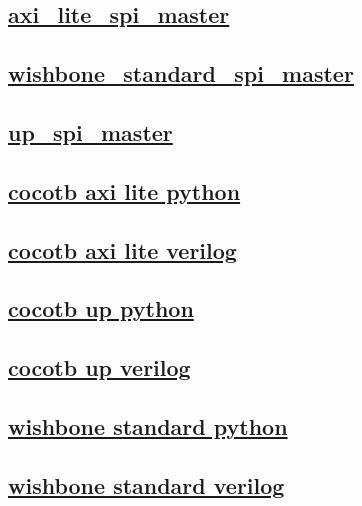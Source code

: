 \documentclass{article}
\begin{document}
  


  \subsection{\href{../files/axi_lite_spi_master-v.html}{axi\_lite\_spi\_master}}

  \subsection{\href{../files/wishbone_standard_spi_master-v.html}{wishbone\_standard\_spi\_master}}

  \subsection{\href{../files/up_spi_master-v.html}{up\_spi\_master}}

  \subsection{\href{../files2/tb_cocotb_axi_lite-py.html}{cocotb axi lite python}}
  \subsection{\href{../files2/tb_cocotb_axi_lite-v.html}{cocotb axi lite verilog}}
  \subsection{\href{../files2/tb_cocotb_up-py.html}{cocotb up python}}
  \subsection{\href{../files2/tb_cocotb_up-v.html}{cocotb up verilog}}
  \subsection{\href{../files2/tb_cocotb_wishbone_standard-py.html}{wishbone standard python}}
  \subsection{\href{../files2/tb_cocotb_wishbone_standard-v.html}{wishbone standard verilog}}
\end{document}
